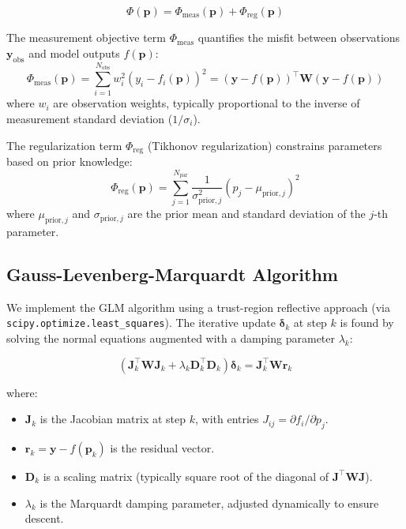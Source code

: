 \documentclass[12pt,a4paper]{article}
\theoremstyle{plain}
\theoremstyle{definition}
\theoremstyle{remark}
\begin{document}
\begin{equation}
	\Phi(\mathbf{p}) = \Phi_{\text{meas}}(\mathbf{p}) + \Phi_{\text{reg}}(\mathbf{p})
\end{equation}

The measurement objective term $\Phi_{\text{meas}}$ quantifies the misfit between observations $\mathbf{y}_{\text{obs}}$ and model outputs $f(\mathbf{p})$:
\begin{equation}
	\Phi_{\text{meas}}(\mathbf{p}) = \sum_{i=1}^{N_{\text{obs}}} w_i^2 (y_i - f_i(\mathbf{p}))^2 = (\mathbf{y} - f(\mathbf{p}))^\top \mathbf{W} (\mathbf{y} - f(\mathbf{p}))
\end{equation}
where $w_i$ are observation weights, typically proportional to the inverse of measurement standard deviation ($1/\sigma_i$).

The regularization term $\Phi_{\text{reg}}$ (Tikhonov regularization) constrains parameters based on prior knowledge:
\begin{equation}
	\Phi_{\text{reg}}(\mathbf{p}) = \sum_{j=1}^{N_{\text{par}}} \frac{1}{\sigma_{\text{prior}, j}^2} (p_j - \mu_{\text{prior}, j})^2
\end{equation}
where $\mu_{\text{prior}, j}$ and $\sigma_{\text{prior}, j}$ are the prior mean and standard deviation of the $j$-th parameter.

\subsection{Gauss-Levenberg-Marquardt Algorithm}

We implement the GLM algorithm using a trust-region reflective approach (via \texttt{scipy.optimize.least\_squares}). The iterative update $\boldsymbol{\delta}_k$ at step $k$ is found by solving the normal equations augmented with a damping parameter $\lambda_k$:

\begin{equation}
	(\mathbf{J}_k^\top \mathbf{W} \mathbf{J}_k + \lambda_k \mathbf{D}_k^\top \mathbf{D}_k) \boldsymbol{\delta}_k = \mathbf{J}_k^\top \mathbf{W} \mathbf{r}_k
\end{equation}

where:
\begin{itemize}
	\item $\mathbf{J}_k$ is the Jacobian matrix at step $k$, with entries $J_{ij} = \partial f_i / \partial p_j$.
	\item $\mathbf{r}_k = \mathbf{y} - f(\mathbf{p}_k)$ is the residual vector.
	\item $\mathbf{D}_k$ is a scaling matrix (typically square root of the diagonal of $\mathbf{J}^\top \mathbf{W} \mathbf{J}$).
	\item $\lambda_k$ is the Marquardt damping parameter, adjusted dynamically to ensure descent.
\end{itemize}
\end{document}
